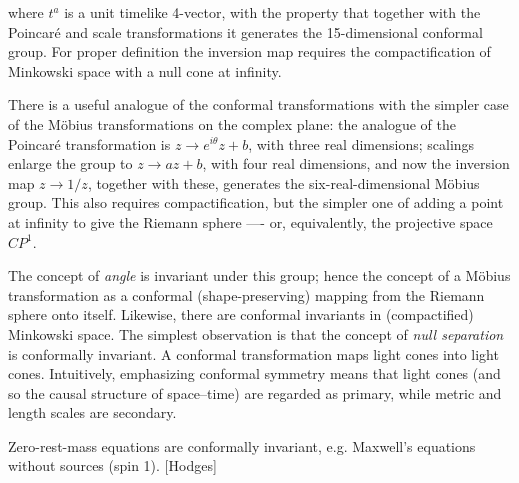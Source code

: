 where $t^a$ is a unit timelike 4-vector, with the property that together with the Poincaré and scale transformations it generates the 15-dimensional conformal group. For proper definition the inversion map requires the compactification of Minkowski space with a null cone at infinity.

There is a useful analogue of the conformal transformations with the simpler case of the Möbius transformations on the complex plane: the analogue of the Poincaré transformation is $z \rightarrow e^{i\theta} z + b$, with three real dimensions; scalings enlarge the group to $z \rightarrow az + b$, with four real dimensions, and now the inversion map $z \rightarrow 1/z$, together with these, generates the six-real-dimensional Möbius group. This also requires compactification, but the simpler one of adding a point at infinity to give the Riemann sphere —- or, equivalently, the projective space $CP^1$.

The concept of \emph{angle} is invariant under this group; hence the concept of a Möbius transformation as a conformal (shape-preserving) mapping from the Riemann sphere onto itself.
Likewise, there are conformal invariants in (compactified) Minkowski space. The simplest observation is that the concept of \emph{null separation} is conformally invariant. A conformal transformation maps light cones into light cones. Intuitively, emphasizing conformal symmetry
means that light cones (and so the causal structure of space–time) are regarded as primary, while metric and length scales are secondary.

Zero-rest-mass equations are conformally invariant, e.g. Maxwell's equations without sources (spin 1).
[Hodges]